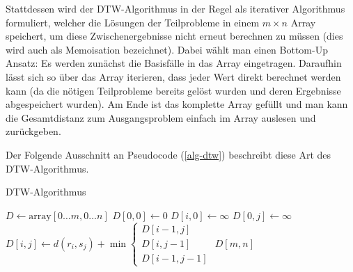 \documentclass{whswinvcbook}
\begin{document}
Stattdessen wird der DTW-Algorithmus in der Regel als iterativer Algorithmus formuliert, welcher die Lösungen der Teilprobleme in einem $m\times n$ Array speichert, um diese Zwischenergebnisse nicht erneut berechnen zu müssen (dies wird auch als Memoisation bezeichnet). Dabei wählt man einen Bottom-Up Ansatz: Es werden zunächst die Basisfälle in das Array eingetragen. Daraufhin lässt sich so über das Array iterieren, dass jeder Wert direkt berechnet werden kann (da die nötigen Teilprobleme bereits gelöst wurden und deren Ergebnisse abgespeichert wurden). Am Ende ist das komplette Array gefüllt und man kann die Gesamtdistanz zum Ausgangsproblem einfach im Array auslesen und zurückgeben.

Der Folgende Ausschnitt an Pseudocode (\ref{alg-dtw}) beschreibt diese Art des DTW-Algorithmus.
\begin{algorithm}[H]
    \caption{DTW-Algorithmus}\label{alg-dtw}
    \begin{algorithmic}[1]
            \State $D\gets\text{array}[0\dots m,0\dots n]$
            \State $D[0,0]\gets0$
                \State $D[i,0]\gets\infty$
            \EndFor
                \State $D[0,j]\gets\infty$
            \EndFor
                    \State $D[i,j]\gets d(r_i,s_j)+\min\begin{cases}D[i-1,j]\\D[i,j-1]\\D[i-1,j-1]\end{cases}$
                \EndFor
            \EndFor
            \State \Return $D[m,n]$
        \EndFunction
    \end{algorithmic}
\end{algorithm}
\end{document}

